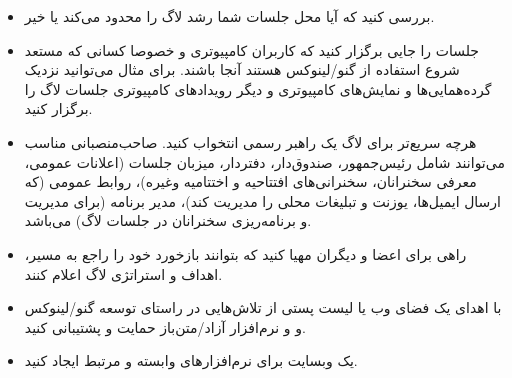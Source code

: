 \begin{itemize}
(کاملا اختیاری:) به فکر تأمین وضعیت قانونی رسمی برای گروه باشید،
مانند ثبت شرکت یا وضعیت معافیت مالیاتی.
\item
بررسی کنید که آیا محل جلسات شما رشد لاگ را محدود می‌کند یا خیر.
\item
جلسات را جایی برگزار کنید که کاربران کامپیوتری و خصوصا کسانی که
مستعد شروع استفاده از گنو/لینوکس هستند آنجا باشند. برای مثال می‌توانید
نزدیک گرده‌همایی‌ها و نمایش‌های کامپیوتری و دیگر رویدادهای کامپیوتری
جلسات لاگ را برگزار کنید.
\item
هرچه سریع‌تر برای لاگ یک راهبر رسمی انتخواب کنید. صاحب‌منصبانی مناسب می‌توانند شامل
رئیس‌جمهور، صندوق‌دار، دفتردار، میزبان جلسات (اعلانات عمومی، معرفی سخنرانان، سخنرانی‌های
افتتاحیه و اختتامیه وغیره)، روابط عمومی (که ارسال ایمیل‌ها، یوزنت و تبلیغات محلی را
مدیریت کند)، مدیر برنامه (برای مدیریت و برنامه‌ریزی سخنرانان در جلسات لاگ) می‌باشد.
\item
راهی برای اعضا و دیگران مهیا کنید که بتوانند بازخورد خود را راجع به
مسیر، اهداف و استراتژی لاگ اعلام کنند.
\item
با اهدای یک فضای وب یا لیست‌ پستی از تلاش‌هایی در راستای توسعه گنو/لینوکس و
و نرم‌افزار آزاد/متن‌باز حمایت و پشتیبانی کنید.
\item
یک وبسایت برای نرم‌افزارهای وابسته و مرتبط ایجاد کنید.

\end{itemize}
